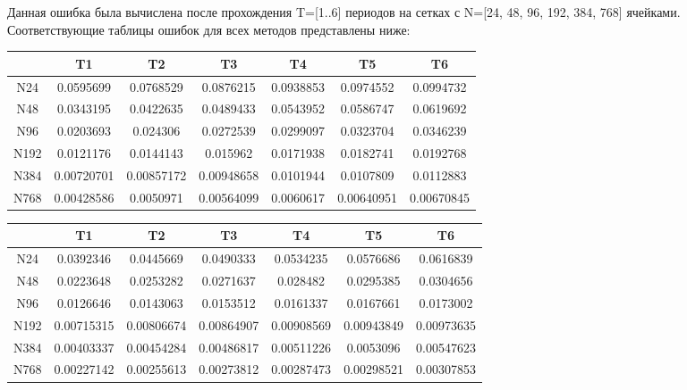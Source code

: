 \documentclass[12pt,a4paper]{article}
\begin{document}
Данная ошибка была вычислена после прохождения T=[1..6] периодов на сетках с N=[24, 48, 96, 192, 384, 768] ячейками. Соответствующие таблицы ошибок для всех методов представлены ниже:

\begin{center}
\begin{tabular}{|c|c|c|c|c|c|c|}
\hline
  & T1 & T2 & T3 & T4 & T5 & T6 \\
\hline
N24 & 0.0595699 & 0.0768529 & 0.0876215 & 0.0938853 & 0.0974552 & 0.0994732 \\
\hline
N48 & 0.0343195 & 0.0422635 & 0.0489433 & 0.0543952 & 0.0586747 & 0.0619692 \\
\hline
N96 & 0.0203693 & 0.024306 & 0.0272539 & 0.0299097 & 0.0323704 & 0.0346239 \\
\hline
N192 & 0.0121176 & 0.0144143 & 0.015962 & 0.0171938 & 0.0182741 & 0.0192768 \\
\hline
N384 & 0.00720701 & 0.00857172 & 0.00948658 & 0.0101944 & 0.0107809 & 0.0112883 \\
\hline
N768 & 0.00428586 & 0.0050971 & 0.00564099 & 0.0060617 & 0.00640951 & 0.00670845 \\
\hline
\end{tabular}
\label{tab:GodunovError}
\end{center}

\begin{center}
\begin{tabular}{|c|c|c|c|c|c|c|}
\hline
  & T1 & T2 & T3 & T4 & T5 & T6 \\
\hline
N24 & 0.0392346 & 0.0445669 & 0.0490333 & 0.0534235 & 0.0576686 & 0.0616839 \\
\hline
N48 & 0.0223648 & 0.0253282 & 0.0271637 & 0.028482 & 0.0295385 & 0.0304656 \\
\hline
N96 & 0.0126646 & 0.0143063 & 0.0153512 & 0.0161337 & 0.0167661 & 0.0173002 \\
\hline
N192 & 0.00715315 & 0.00806674 & 0.00864907 & 0.00908569 & 0.00943849 & 0.00973635 \\
\hline
N384 & 0.00403337 & 0.00454284 & 0.00486817 & 0.00511226 & 0.0053096 & 0.00547623 \\
\hline
N768 & 0.00227142 & 0.00255613 & 0.00273812 & 0.00287473 & 0.00298521 & 0.00307853 \\
\hline
\end{tabular}
\label{tab:MUSCLError}
\end{center}
\end{document}
